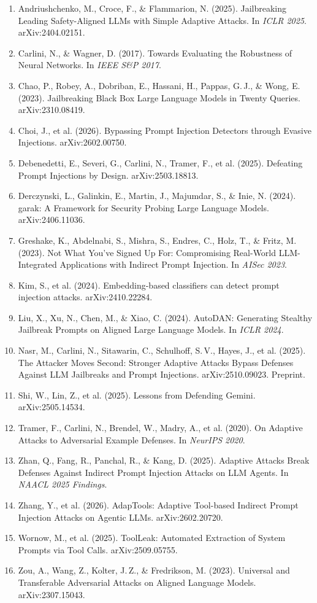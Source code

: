 \documentclass[11pt]{article}
\begin{document}
\begin{enumerate}
  \item Andriushchenko, M., Croce, F., \& Flammarion, N. (2025). Jailbreaking Leading Safety-Aligned LLMs with Simple Adaptive Attacks. In \textit{ICLR 2025}. arXiv:2404.02151.
  \item Carlini, N., \& Wagner, D. (2017). Towards Evaluating the Robustness of Neural Networks. In \textit{IEEE S\&P 2017}.
  \item Chao, P., Robey, A., Dobriban, E., Hassani, H., Pappas, G.\,J., \& Wong, E. (2023). Jailbreaking Black Box Large Language Models in Twenty Queries. arXiv:2310.08419.
  \item Choi, J., et al. (2026). Bypassing Prompt Injection Detectors through Evasive Injections. arXiv:2602.00750.
  \item Debenedetti, E., Severi, G., Carlini, N., Tramer, F., et al. (2025). Defeating Prompt Injections by Design. arXiv:2503.18813.
  \item Derczynski, L., Galinkin, E., Martin, J., Majumdar, S., \& Inie, N. (2024). garak: A Framework for Security Probing Large Language Models. arXiv:2406.11036.
  \item Greshake, K., Abdelnabi, S., Mishra, S., Endres, C., Holz, T., \& Fritz, M. (2023). Not What You've Signed Up For: Compromising Real-World LLM-Integrated Applications with Indirect Prompt Injection. In \textit{AISec 2023}.
  \item Kim, S., et al. (2024). Embedding-based classifiers can detect prompt injection attacks. arXiv:2410.22284.
  \item Liu, X., Xu, N., Chen, M., \& Xiao, C. (2024). AutoDAN: Generating Stealthy Jailbreak Prompts on Aligned Large Language Models. In \textit{ICLR 2024}.
  \item Nasr, M., Carlini, N., Sitawarin, C., Schulhoff, S.\,V., Hayes, J., et al. (2025). The Attacker Moves Second: Stronger Adaptive Attacks Bypass Defenses Against LLM Jailbreaks and Prompt Injections. arXiv:2510.09023. Preprint.
  \item Shi, W., Lin, Z., et al. (2025). Lessons from Defending Gemini. arXiv:2505.14534.
  \item Tramer, F., Carlini, N., Brendel, W., Madry, A., et al. (2020). On Adaptive Attacks to Adversarial Example Defenses. In \textit{NeurIPS 2020}.
  \item Zhan, Q., Fang, R., Panchal, R., \& Kang, D. (2025). Adaptive Attacks Break Defenses Against Indirect Prompt Injection Attacks on LLM Agents. In \textit{NAACL 2025 Findings}.
  \item Zhang, Y., et al. (2026). AdapTools: Adaptive Tool-based Indirect Prompt Injection Attacks on Agentic LLMs. arXiv:2602.20720.
  \item Wornow, M., et al. (2025). ToolLeak: Automated Extraction of System Prompts via Tool Calls. arXiv:2509.05755.
  \item Zou, A., Wang, Z., Kolter, J.\,Z., \& Fredrikson, M. (2023). Universal and Transferable Adversarial Attacks on Aligned Language Models. arXiv:2307.15043.
\end{enumerate}
\end{document}
